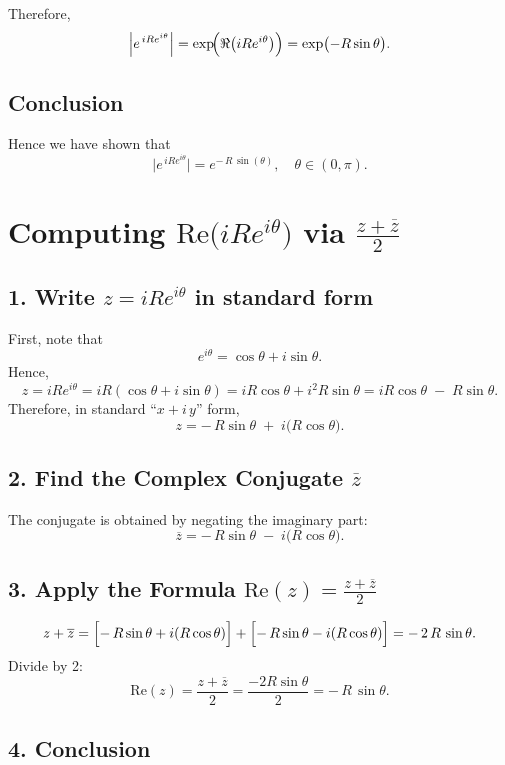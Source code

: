 \documentclass[12pt]{article}
\theoremstyle{definition} %
\theoremstyle{plain} %
\begin{document}
Therefore,
\[
\left\lvert e^{\,i R e^{i\theta}} \right\rvert 
= \exp\!\Bigl(\Re\bigl(i R e^{i\theta}\bigr)\Bigr)
= \exp\bigl(-R \sin\theta\bigr).
\]

\subsection*{Conclusion}

Hence we have shown that
\[
\boxed{
\bigl\lvert e^{\,i R e^{i\theta}}\bigr\rvert 
= e^{-\,R\,\sin(\theta)},
\quad \theta\in(0,\pi).
}
\]

\section*{Computing \(\mathrm{Re}\bigl(i R e^{i\theta}\bigr)\) via \(\frac{z + \overline{z}}{2}\)}

\subsection*{1. Write \(z = i R e^{i\theta}\) in standard form}

First, note that
\[
e^{i\theta} = \cos\theta + i\sin\theta.
\]
Hence,
\[
z = i R e^{i\theta}
= i R (\cos\theta + i\sin\theta)
= iR\cos\theta + i^2 R\sin\theta
= iR\cos\theta \;-\; R\sin\theta.
\]
Therefore, in standard ``\(x + i\,y\)'' form,
\[
z = -\,R\sin\theta \;+\; i\bigl(R\cos\theta\bigr).
\]

\subsection*{2. Find the Complex Conjugate \(\overline{z}\)}

The conjugate is obtained by negating the imaginary part:
\[
\overline{z} 
= -\,R\sin\theta \;-\; i\bigl(R\cos\theta\bigr).
\]

\subsection*{3. Apply the Formula \(\mathrm{Re}(z) = \frac{z + \overline{z}}{2}\)}

\[
z + \overline{z}
= \Bigl[-\,R\sin\theta + i(R\cos\theta)\Bigr]
 + \Bigl[-\,R\sin\theta - i(R\cos\theta)\Bigr]
= -\,2\,R\,\sin\theta.
\]
Divide by 2:
\[
\mathrm{Re}(z)
= \frac{z + \overline{z}}{2}
= \frac{-2R\sin\theta}{2}
= -\,R\,\sin\theta.
\]

\subsection*{4. Conclusion}
\end{document}
